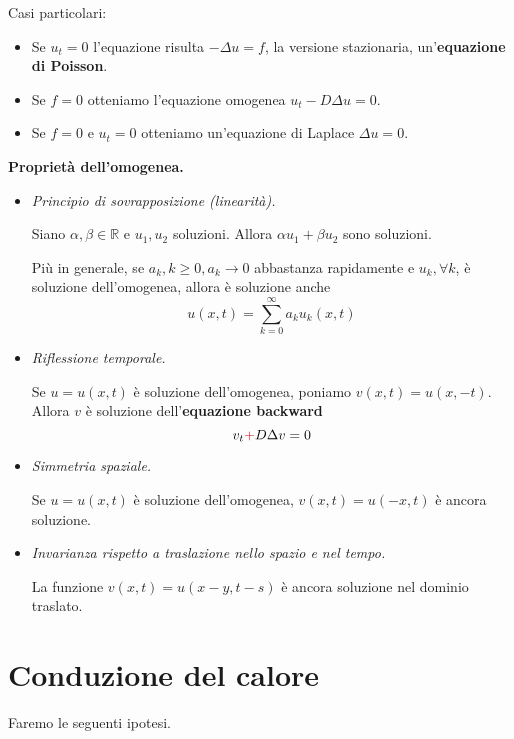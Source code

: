 \documentclass[10pt,a4paper,twoside,openright]{book}
\begin{document}
Casi particolari:
\begin{itemize}
    \item Se $u_{t} =0$ l'equazione risulta $-\Delta u=f$, la versione stazionaria, un'\textbf{equazione di Poisson}.
    \item Se $f=0$ otteniamo l'equazione omogenea $u_{t} -D\Delta u=0$.
    \item Se $f=0$ e $u_{t} =0$ otteniamo un'equazione di Laplace $\Delta u=0$.
\end{itemize}

\textbf{Proprietà dell'omogenea.}
\begin{itemize}
    \item \emph{Principio di sovrapposizione (linearità).}

          Siano $\alpha,\beta \in \mathbb{R}$ e $u_{1},u_{2}$ soluzioni. Allora $\alpha u_{1} +\beta u_{2}$ sono soluzioni.

          Più in generale, se $a_{k},k\geqslant 0,a_{k}\rightarrow 0$ abbastanza rapidamente e $u_{k},\forall k$, è soluzione dell'omogenea, allora è soluzione anche
          \begin{equation*}
              u(x,t) = \sum\limits ^{\infty }_{k=0} a_{k} u_{k}(x,t)
          \end{equation*}

    \item \emph{Riflessione temporale.}

          Se $u=u(x,t)$ è soluzione dell'omogenea, poniamo $v(x,t) =u(x,-t)$. Allora $v$ è soluzione dell'\textbf{equazione backward}
          \begin{equation*}
              v_{t}\textcolor[rgb]{0.82,0.01,0.11}{+} D\Delta v=0
          \end{equation*}
    \item \emph{Simmetria spaziale.}

          Se $u=u(x,t)$ è soluzione dell'omogenea, $v(x,t) =u(-x,t)$ è ancora soluzione.

    \item \emph{Invarianza rispetto a traslazione nello spazio e nel tempo.}

          La funzione $v(x,t) =u(x-y,t-s)$ è ancora soluzione nel dominio traslato.
\end{itemize}

\section{Conduzione del calore}
Faremo le seguenti ipotesi.
\end{document}
